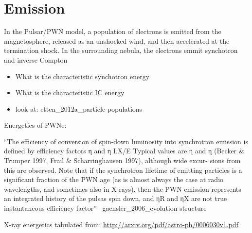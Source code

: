 \section{ Emission}

In the Pulsar/\ac{PWN} model, a population of electrons
is emitted from the magnetosphere, released as an unshocked wind,
and then accelerated at the termination shock. In the surrounding
nebula, the electrons emmit synchotron and inverse Compton

\begin{itemize}
  \item What is the characteristic synchotron energy
  \item What is the characteristic \ac{IC} energy
  \item look at: etten\_2012a\_particle-populations
\end{itemize}




Energetics of PWNe:

``The efficiency of conversion of spin-down luminosity into synchrotron
emission is defined by efficiency factors η and
η LX/E  Typical values are η
and η (Becker \& Trumper 1997, Frail
\& Scharringhausen 1997), although wide excur- sions from this are
observed. Note that if the synchrotron lifetime of emitting particles is
a significant fraction of the PWN age (as is almost always the case at
radio wavelengths, and sometimes also in X-rays), then the PWN emission
represents an integrated history of the pulsas spin down,
and ηR and ηX are not true instantaneous efficiency factor'' --gaensler\_2006\_evolution-structure

X-ray energetics tabulated from: \url{http://arxiv.org/pdf/astro-ph/0006030v1.pdf}
